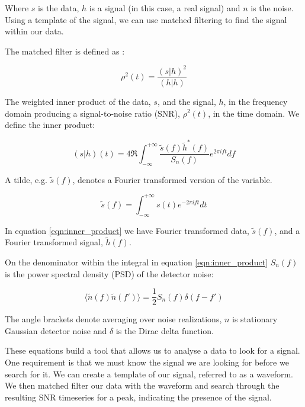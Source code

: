 Where $s$ is the data, $h$ is a signal (in this case, a real \gw signal) and $n$ is the noise. Using a template of the signal, we can use matched filtering to find the signal within our data.

The matched filter is defined as \cite{PyCBC_Search}:

\begin{equation}
   \rho^2(t) = \frac{(s|h)^2}{(h|h)}
   \label{eqn:matched_filter}
\end{equation}

The weighted inner product of the data, $s$, and the signal, $h$, in the frequency domain producing a signal-to-noise ratio (SNR), $\rho^2(t)$, in the time domain. We define the inner product:

\begin{equation}
   (s|h)(t) = 4 \Re \int^{+\infty}_{-\infty} \frac{\tilde{s}(f) \tilde{h}^*(f)}{S_n(f)} e^{2 \pi i f t} df
   \label{eqn:inner_product}
\end{equation}

A tilde, e.g. $\tilde{s}(f)$, denotes a Fourier transformed version of the variable.

\begin{equation}
   \tilde{s}(f) = \int^{+\infty}_{-\infty} s(t) e^{-2 \pi i f t} dt
   \label{eqn:fourier_transform}
\end{equation}

In equation \ref{eqn:inner_product} we have Fourier transformed data, $\tilde{s}(f)$, and a Fourier transformed signal, $\tilde{h}(f)$.

On the denominator within the integral in equation \ref{eqn:inner_product} $S_n(f)$ is the power spectral density (PSD) of the detector noise:

\begin{equation}
   \langle \tilde{n}(f) \tilde{n}(f') \rangle = \frac{1}{2} S_n(f) \delta(f-f')
   \label{eqn:PSD}
\end{equation}

The angle brackets denote averaging over noise realizations, $n$ is stationary Gaussian detector noise and $\delta$ is the Dirac delta function.

These equations build a tool that allows us to analyse a data to look for a signal. One requirement is that we must know the signal we are looking for before we search for it. We can create a template of our signal, referred to as a waveform. We then matched filter our data with the waveform and search through the resulting SNR timeseries for a peak, indicating the presence of the signal.

